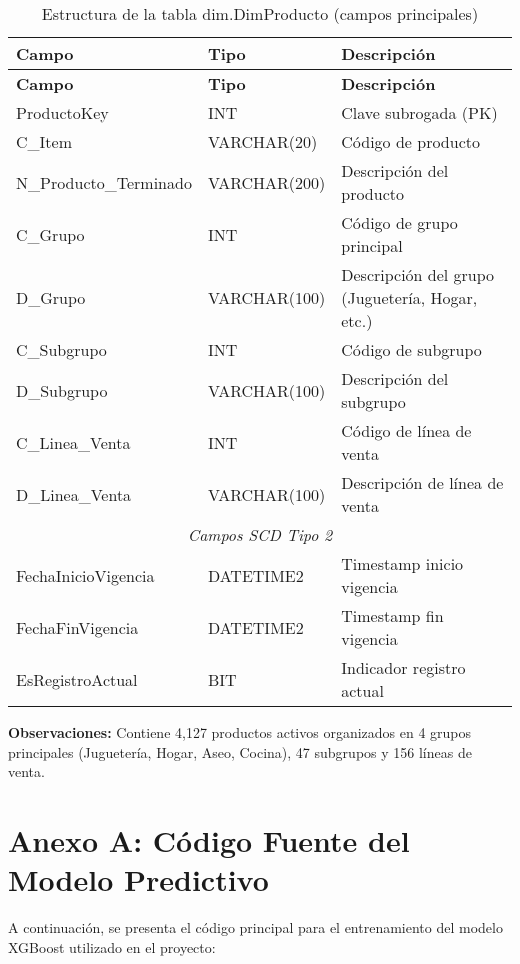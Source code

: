 \begin{longtable}{|p{4cm}|p{3cm}|p{8cm}|}
\caption{Estructura de la tabla dim.DimProducto (campos principales)} \\
\hline
\textbf{Campo} & \textbf{Tipo} & \textbf{Descripción} \\
\hline
\endfirsthead
\hline
\textbf{Campo} & \textbf{Tipo} & \textbf{Descripción} \\
\hline
\endhead
ProductoKey & INT & Clave subrogada (PK) \\
\hline
C\_Item & VARCHAR(20) & Código de producto \\
\hline
N\_Producto\_Terminado & VARCHAR(200) & Descripción del producto \\
\hline
C\_Grupo & INT & Código de grupo principal \\
\hline
D\_Grupo & VARCHAR(100) & Descripción del grupo (Juguetería, Hogar, etc.) \\
\hline
C\_Subgrupo & INT & Código de subgrupo \\
\hline
D\_Subgrupo & VARCHAR(100) & Descripción del subgrupo \\
\hline
C\_Linea\_Venta & INT & Código de línea de venta \\
\hline
D\_Linea\_Venta & VARCHAR(100) & Descripción de línea de venta \\
\hline
\multicolumn{3}{|c|}{\textit{Campos SCD Tipo 2}} \\
\hline
FechaInicioVigencia & DATETIME2 & Timestamp inicio vigencia \\
\hline
FechaFinVigencia & DATETIME2 & Timestamp fin vigencia \\
\hline
EsRegistroActual & BIT & Indicador registro actual \\
\hline
\end{longtable}

\textbf{Observaciones:} Contiene 4,127 productos activos organizados en 4 grupos principales (Juguetería, Hogar, Aseo, Cocina), 47 subgrupos y 156 líneas de venta.
\section{Anexo A: Código Fuente del Modelo Predictivo}

A continuación, se presenta el código principal para el entrenamiento del modelo XGBoost utilizado en el proyecto:


